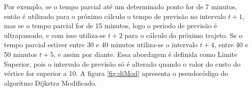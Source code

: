 Por exemplo, se o tempo parcial até um determinado ponto for de 7 minutos, então
é utilizado para o próximo cálculo o tempo de previsão no intervalo $t + 1$, mas se o tempo parcial for de 15 minutos, logo
o período de previsão é ultrapassado, e com isso utiliza-se $t + 2$ para o cálculo do próximo trajeto. Se o tempo parcial
estiver entre 30 e 40 minutos utiliza-se o intervalo $t + 4$, entre 40 e 50 minutos $t + 5$, e assim por diante.
Essa abordagem é definida como Limite Superior, pois o intervalo de previsão só é alterado quando o 
valor do custo do vértice for superior a 10. A figura \ref{fig:diMod} apresenta o pseudocódigo do algoritmo Dijkstra Modificado.

